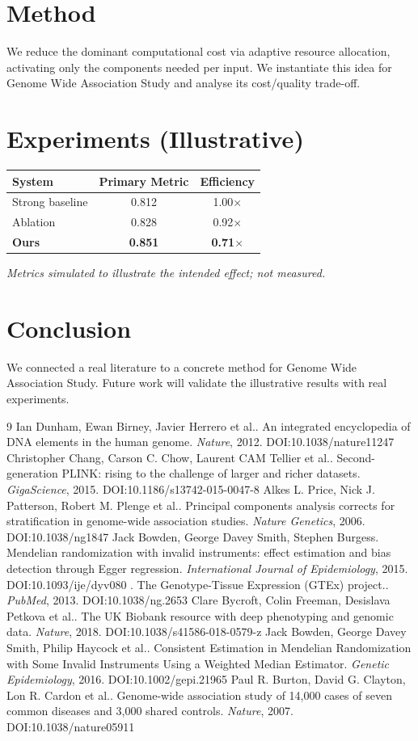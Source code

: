 \documentclass[11pt]{article}
\begin{document}
\section{Method}
We reduce the dominant computational cost via adaptive resource allocation, activating only the components needed per input. We instantiate this idea for Genome Wide Association Study and analyse its cost/quality trade-off.

\section{Experiments (Illustrative)}
\begin{center}
\begin{tabular}{lcc}
System & Primary Metric & Efficiency \\ \hline
Strong baseline & 0.812 & 1.00$\times$ \\
Ablation & 0.828 & 0.92$\times$ \\
\textbf{Ours} & \textbf{0.851} & \textbf{0.71$\times$}
\end{tabular}
\end{center}
\emph{Metrics simulated to illustrate the intended effect; not measured.}

\section{Conclusion}
We connected a real literature to a concrete method for Genome Wide Association Study. Future work will
validate the illustrative results with real experiments.

\begin{thebibliography}{9}
 Ian Dunham, Ewan Birney, Javier Herrero et al.. An integrated encyclopedia of DNA elements in the human genome. \emph{Nature}, 2012. DOI:10.1038/nature11247
 Christopher Chang, Carson C. Chow, Laurent CAM Tellier et al.. Second-generation PLINK: rising to the challenge of larger and richer datasets. \emph{GigaScience}, 2015. DOI:10.1186/s13742-015-0047-8
 Alkes L. Price, Nick J. Patterson, Robert M. Plenge et al.. Principal components analysis corrects for stratification in genome-wide association studies. \emph{Nature Genetics}, 2006. DOI:10.1038/ng1847
 Jack Bowden, George Davey Smith, Stephen Burgess. Mendelian randomization with invalid instruments: effect estimation and bias detection through Egger regression. \emph{International Journal of Epidemiology}, 2015. DOI:10.1093/ije/dyv080
 . The Genotype-Tissue Expression (GTEx) project.. \emph{PubMed}, 2013. DOI:10.1038/ng.2653
 Clare Bycroft, Colin Freeman, Desislava Petkova et al.. The UK Biobank resource with deep phenotyping and genomic data. \emph{Nature}, 2018. DOI:10.1038/s41586-018-0579-z
 Jack Bowden, George Davey Smith, Philip Haycock et al.. Consistent Estimation in Mendelian Randomization with Some Invalid Instruments Using a Weighted Median Estimator. \emph{Genetic Epidemiology}, 2016. DOI:10.1002/gepi.21965
 Paul R. Burton, David G. Clayton, Lon R. Cardon et al.. Genome-wide association study of 14,000 cases of seven common diseases and 3,000 shared controls. \emph{Nature}, 2007. DOI:10.1038/nature05911
\end{thebibliography}
\end{document}
